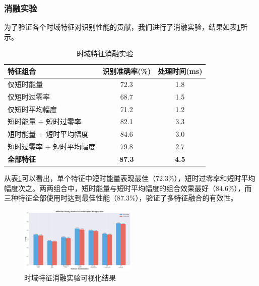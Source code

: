 \documentclass[sigconf,nonacm]{acmart}
\begin{document}

\subsubsection{消融实验}

为了验证各个时域特征对识别性能的贡献，我们进行了消融实验，结果如表\ref{tab:ablation_study}所示。

\begin{table}[htbp]
\caption{时域特征消融实验}
\label{tab:ablation_study}
\begin{center}
\begin{tabular}{lcc}
\toprule
\textbf{特征组合} & \textbf{识别准确率(\%)} & \textbf{处理时间(ms)} \\
\midrule
仅短时能量 & 72.3 & 1.8 \\
仅短时过零率 & 68.7 & 1.5 \\
仅短时平均幅度 & 71.2 & 1.2 \\
短时能量 + 短时过零率 & 82.1 & 3.3 \\
短时能量 + 短时平均幅度 & 84.6 & 3.0 \\
短时过零率 + 短时平均幅度 & 79.8 & 2.7 \\
\midrule
\textbf{全部特征} & \textbf{87.3} & \textbf{4.5} \\
\bottomrule
\end{tabular}
\end{center}
\end{table}

从表\ref{tab:ablation_study}可以看出，单个特征中短时能量表现最佳（72.3\%），短时过零率和短时平均幅度次之。两两组合中，短时能量与短时平均幅度的组合效果最好（84.6\%），而三种特征全部使用时达到最佳性能（87.3\%），验证了多特征融合的有效性。

\begin{figure}[htbp]
\centering
\includegraphics[width=0.5\textwidth]{ablation/feature_comparison.png}
\caption{时域特征消融实验可视化结果}
\label{fig:ablation_comparison}
\end{figure}
\end{document}
